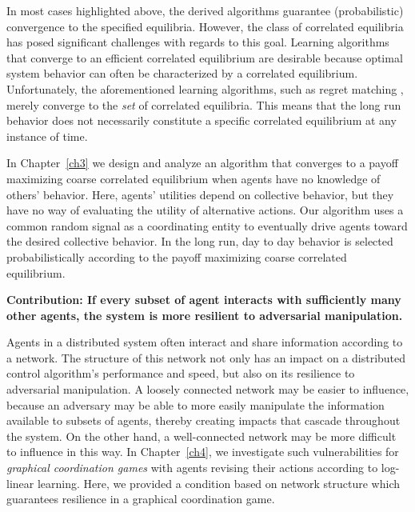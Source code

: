 In most cases highlighted above, the derived algorithms guarantee (probabilistic) convergence to the specified equilibria.  However, the class of correlated equilibria has posed significant challenges with regards to this goal. Learning algorithms that converge to an efficient correlated equilibrium are desirable because optimal system behavior can often be characterized by a correlated equilibrium. Unfortunately, the aforementioned learning algorithms, such as regret matching \cite{Hart2000}, merely converge to the \emph{set} of correlated equilibria. This means that the long run behavior does not necessarily constitute a specific correlated equilibrium at any instance of time.


In Chapter~\ref{ch3} we design and analyze an algorithm that converges to a payoff maximizing coarse correlated equilibrium when agents have no knowledge of others' behavior. Here, agents' utilities depend on collective behavior, but they have no way of evaluating the utility of alternative actions. Our algorithm uses a common random signal as a coordinating entity to eventually drive agents toward the desired collective behavior. In the long run, day to day behavior is selected probabilistically according to the payoff maximizing coarse correlated equilibrium.

 

\smallskip

 \noindent\textbf{Contribution: If every subset of agent interacts with sufficiently many other agents, the system is more resilient to adversarial manipulation.}


Agents in a distributed system often interact and share information according to a network. The structure of this network not only has an impact on a distributed control algorithm's performance and speed, but also on its resilience to adversarial manipulation. A loosely connected network may be easier to influence, because an adversary may be able to more easily manipulate the information available to subsets of agents, thereby creating impacts that cascade throughout the system. On the other hand, a well-connected network may be more difficult to influence in this way. In Chapter~\ref{ch4}, we investigate such vulnerabilities for  {\it graphical coordination games} \cite{Ullmann1977,Cooper1999} with agents revising their actions according to log-linear learning. Here, we provided a condition based on network structure which guarantees resilience in a graphical coordination game. 


